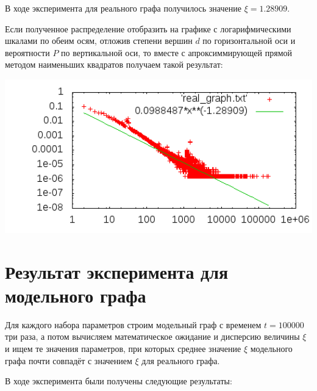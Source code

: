 \documentclass[14pt]{extreport}
\begin{document}
В ходе эксперимента для реального графа получилось значение $\xi = 1.28909$.

Если полученное распределение отобразить на графике с логарифмическими шкалами по обеим осям, отложив степени вершин $d$ по горизонтальной оси и вероятности $P$ по вертикальной оси, то вместе с апроксиммирующей прямой методом наименьших квадратов\cite{book4} получаем такой результат:

\begin{center}
\includegraphics[width=160mm]{code/real_graph.png}
\end{center}

\section{Результат эксперимента для модельного графа}

Для каждого набора параметров строим модельный граф с временем $t = 100000$ три раза, а потом вычисляем математическое ожидание и дисперсию величины $\xi$ и ищем те значения параметров, при которых среднее значение $\xi$ модельного графа почти совпадёт с значением $\xi$ для реального графа.

В ходе эксперимента были получены следующие результаты:
\end{document}
